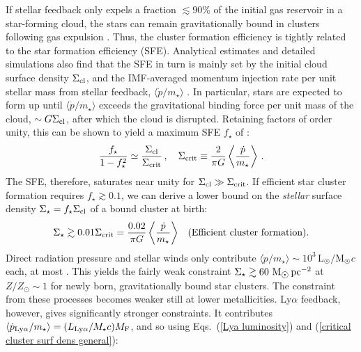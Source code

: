 \documentclass[fleqn,usenatbib]{mnras}
\newcommand\Msun{\text{M}_{\astrosun}} %
\newcommand\Lsun{\text{L}_{\astrosun}} %
\begin{document}
If stellar feedback only expels a fraction $\lesssim 90\%$ of the initial gas reservoir in a star-forming cloud, the stars can remain gravitationally bound in clusters following gas expulsion \citep[e.g.][]{Hills1980, Adams2000, Baumgardt2007, Li2019, Fukushima2021, Farias2024}. Thus, the cluster formation efficiency is tightly related to the star formation efficiency (SFE). Analytical estimates and detailed simulations also find that the SFE in turn is mainly set by the initial cloud surface density $\Sigma_{\rm cl}$, and the IMF-averaged momentum injection rate per unit stellar mass from stellar feedback, $\langle \Dot{p}/m_{\star} \rangle$ \citep[e.g.][]{Fall2010, Raskutti2016, Grudic2018, Li2019, Fukushima2021, Menon2024}. In particular, stars are expected to form up until $\langle \Dot{p}/m_{\star} \rangle$ exceeds the gravitational binding force per unit mass of the cloud, $\sim G \Sigma_{\rm cl}$, after which the cloud is disrupted. Retaining factors of order unity, this can be shown to yield a maximum SFE $f_{\star}$ of \citep[e.g.][]{Fukushima2021}:
\begin{equation}
    \dfrac{f_{\star}}{1 - f_{\star}^2} \simeq \dfrac{\Sigma_{\rm cl}}{\Sigma_{\rm crit}}  \, , \quad \Sigma_{\rm crit} \equiv \dfrac{2}{\pi G} \left\langle \dfrac{\Dot{p}}{m_{\star}} \right\rangle \, .
\end{equation}
The SFE, therefore, saturates near unity for $\Sigma_{\rm cl} \gg \Sigma_{\rm crit}$. If efficient star cluster formation requires $f_{\star} \gtrsim 0.1$, we can derive a lower bound on the \textit{stellar} surface density $\Sigma_{\star} = f_{\star} \Sigma_{\rm cl}$ of a bound cluster at birth:
\begin{equation}
    \Sigma_{\star} \gtrsim 0.01 \Sigma_{\rm crit} =  \dfrac{0.02}{\pi G} \left\langle \dfrac{\Dot{p}}{m_{\star}} \right\rangle \;\;\; \textrm{(Efficient cluster formation)} . \label{critical cluster surf dens general}
\end{equation}
Direct radiation pressure and stellar winds only contribute $\langle \Dot{p}/m_{\star} \rangle  \sim 10^3\, \Lsun/\Msun c$ each, at most \citep[e.g.][]{Grudic2018, Hopkins2018_FIRE2}. This yields the fairly weak constraint $\Sigma_{\star} \gtrsim 60 ~ \Msun \, \rm pc^{-2}$ at $Z/Z_{\odot} \sim 1$ for newly born, gravitationally bound star clusters. The constraint from these processes becomes weaker still at lower metallicities. Ly$\alpha$ feedback, however, gives significantly stronger constraints. It contributes $\langle \Dot{p}_{\rm Ly\alpha}/m_{\star} \rangle = (L_{\rm Ly\alpha}/M_{\star}c) M_{\rm F}$, and so using Eqs.~(\ref{Lya luminosity}) and (\ref{critical cluster surf dens general}):
\end{document}
